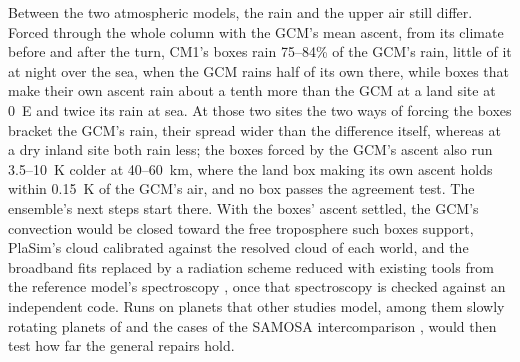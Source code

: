 Between the two atmospheric models, the rain and the upper air still differ. Forced through the whole column with
the GCM's mean ascent, from its climate before and after the turn, CM1's boxes rain 75--84\% of the GCM's rain, little
of it at night over the sea, when the GCM rains half of its own there, while boxes that make their own ascent rain
about a tenth more than the GCM at a land site at 0\textdegree~E and twice its rain at sea.
At those two sites the two ways of forcing the boxes bracket the GCM's rain, their spread wider than the difference
itself, whereas at a dry inland site both rain less; the boxes forced by the GCM's ascent also run 3.5--10~K colder
at 40--60~km, where the land box making its own ascent holds within 0.15~K of the GCM's air, and no box passes the
agreement test. The ensemble's next
steps start there. With the boxes' ascent settled, the GCM's convection would be closed toward the free troposphere
such boxes support, PlaSim's cloud calibrated against the resolved cloud of each world, and the broadband fits
replaced by a radiation scheme reduced with existing tools from the reference model's spectroscopy
\autocite{hogan2022tool,hogan2020evaluating}, once that spectroscopy is checked against an independent code. Runs on planets that other studies model, among them slowly
rotating planets of \textcite{way2018climates} and the cases of the SAMOSA intercomparison
\autocite{haqqmisra2022samosa}, would then test how far the general repairs hold.
